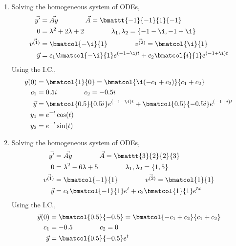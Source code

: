 \begin{enumerate}
    \item Solving the homogeneous system of ODEs,
          \begin{align}
              \vec{y'}      & = \vec{Ay}
              \qquad\qquad
              \vec{A}                           = \bmattt{-1}{-1}{1}{-1}        \\
              0             & = \lambda^{2} + 2\lambda + 2
              \qquad\qquad
              \lambda_1, \lambda_2              = \left\{ -1-\i, -1+\i \right\} \\
              \vec{v^{(1)}} & = \bmatcol{-\i}{1}
              \qquad\qquad
              \vec{v^{(2)}} = \bmatcol{\i}{1}                                   \\
              \vec{y}       & = c_1 \bmatcol{-\i}{1}e^{(-1-\i)t}
              + c_2\bmatcol{i}{1}e^{(-1+\i)t}
          \end{align}
          Using the I.C.,
          \begin{align}
              \vec{y}(0) & = \bmatcol{1}{0} = \bmatcol{\i(-c_1 + c_2)}{c_1 + c_2} \\
              c_1        & = 0.5i \qquad\qquad c_2 = -0.5i                        \\
              \vec{y}    & = \bmatcol{0.5}{0.5i}e^{(-1-\i)t}
              + \bmatcol{0.5}{-0.5i}e^{(-1+i)t}                                   \\
              y_1        & = e^{-t}\cos(t)                                        \\
              y_2        & = e^{-t}\sin(t)
          \end{align}

    \item Solving the homogeneous system of ODEs,
          \begin{align}
              \vec{y'}      & = \vec{Ay}
              \qquad\qquad
              \vec{A}                           = \bmattt{3}{2}{2}{3}   \\
              0             & = \lambda^{2} - 6\lambda + 5
              \qquad\qquad
              \lambda_1, \lambda_2              = \left\{ 1, 5 \right\} \\
              \vec{v^{(1)}} & = \bmatcol{-1}{1}
              \qquad\qquad
              \vec{v^{(2)}} = \bmatcol{1}{1}                            \\
              \vec{y}       & = c_1 \bmatcol{-1}{1}e^{t}
              + c_2\bmatcol{1}{1}e^{5t}
          \end{align}
          Using the I.C.,
          \begin{align}
              \vec{y}(0) & = \bmatcol{0.5}{-0.5} = \bmatcol{-c_1 + c_2}{c_1 + c_2} \\
              c_1        & = -0.5 \qquad\qquad c_2 = 0                             \\
              \vec{y}    & = \bmatcol{0.5}{-0.5}e^{t}
          \end{align}


\end{enumerate}
